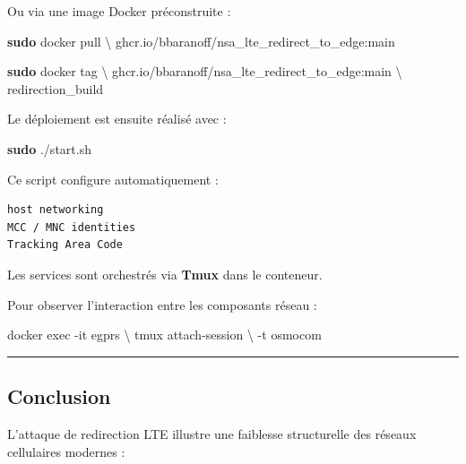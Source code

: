 \documentclass[
  french,
]{article}
\newenvironment{Shaded}{\begin{snugshade}}{\end{snugshade}}
\newcommand{\AttributeTok}[1]{\textcolor[rgb]{0.13,0.29,0.53}{#1}}
\newcommand{\DataTypeTok}[1]{\textcolor[rgb]{0.13,0.29,0.53}{#1}}
\newcommand{\ExtensionTok}[1]{#1}
\newcommand{\FunctionTok}[1]{\textcolor[rgb]{0.13,0.29,0.53}{\textbf{#1}}}
\newcommand{\NormalTok}[1]{#1}
\begin{document}
Ou via une image Docker préconstruite :

\begin{Shaded}
\begin{Highlighting}[]
\FunctionTok{sudo}\NormalTok{ docker pull }\DataTypeTok{\textbackslash{}}
\NormalTok{    ghcr.io/bbaranoff/nsa\_lte\_redirect\_to\_edge:main}

\FunctionTok{sudo}\NormalTok{ docker tag }\DataTypeTok{\textbackslash{}}
\NormalTok{    ghcr.io/bbaranoff/nsa\_lte\_redirect\_to\_edge:main }\DataTypeTok{\textbackslash{}}
\NormalTok{    redirection\_build}
\end{Highlighting}
\end{Shaded}

Le déploiement est ensuite réalisé avec :

\begin{Shaded}
\begin{Highlighting}[]
\FunctionTok{sudo}\NormalTok{ ./start.sh}
\end{Highlighting}
\end{Shaded}

Ce script configure automatiquement :

\begin{verbatim}
host networking
MCC / MNC identities
Tracking Area Code
\end{verbatim}

Les services sont orchestrés via \textbf{Tmux} dans le conteneur.

Pour observer l'interaction entre les composants réseau :

\begin{Shaded}
\begin{Highlighting}[]
\ExtensionTok{docker}\NormalTok{ exec }\AttributeTok{{-}it}\NormalTok{ egprs }\DataTypeTok{\textbackslash{}}
\NormalTok{    tmux attach{-}session }\DataTypeTok{\textbackslash{}}
    \AttributeTok{{-}t}\NormalTok{ osmocom}
\end{Highlighting}
\end{Shaded}

\begin{center}\rule{0.5\linewidth}{0.5pt}\end{center}

\subsection{Conclusion}\label{conclusion-2}

L'attaque de redirection LTE illustre une faiblesse structurelle des
réseaux cellulaires modernes :
\end{document}

